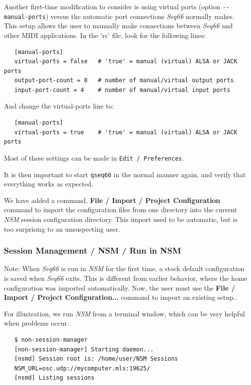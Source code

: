   Another first-time modification to consider is using virtual ports (option
   \texttt{-{}-manual-ports}) versus the automatic port connections
   \textsl{Seq66} normally makes.
   This setup allows the user to manually make connections between
   \textsl{Seq66} and other MIDI applications.
   In the 'rc' file, look for the following lines:

\begin{verbatim}
   [manual-ports]
   virtual-ports = false   # 'true' = manual (virtual) ALSA or JACK ports
   output-port-count = 8   # number of manual/virtual output ports
   input-port-count = 4    # number of manual/virtual input ports
\end{verbatim}

   And change the virtual-ports line to:

\begin{verbatim}
   [manual-ports]
   virtual-ports = true    # 'true' = manual (virtual) ALSA or JACK ports
\end{verbatim}

   Most of these settings can be made in \texttt{Edit / Preferences}.

   It is then important to start \texttt{qseq66} in the normal manner again,
   and verify that everything works as expected.

   We have added a command, \textbf{File / Import / Project Configuration}
   command to import the configuration files from one directory into the
   current \textsl{NSM} session configuration directory.
   This import used to be automatic, but is too surprising to an unsuspecting
   user.

\subsubsection{Session Management / NSM / Run in NSM}
\label{subsec:sessions_nsm_first_run_in_nsm}

   Note: When \textsl{Seq66} is run in \textsl{NSM} for the first time,
   a stock default configuration is saved when
   \textsl{Seq66} exits.
   This is different from earlier behavior, where the home configuration was
   imported automatically.
   Now, the user must use the
   \textbf{File / Import / Project Configuration...}
   command to import an existing setup..

   For illustration, we run \textsl{NSM} from a terminal window, which can be
   very helpful when problems occur.

\begin{verbatim}
   $ non-session-manager
   [non-session-manager] Starting daemon...
   [nsmd] Session root is: /home/user/NSM Sessions
   NSM_URL=osc.udp://mycomputer.mls:19625/
   [nsmd] Listing sessions
\end{verbatim}

